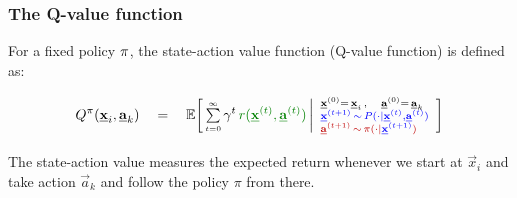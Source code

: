 \begin{frame}\frametitle{The Q-value function}

For a fixed policy ${\color{policy}}\pi$, the state-action value function (Q-value function) is defined as:

\begin{equation}
		Q^\pi(\vec x_i, \vec a_k) \quad=\quad 
		\E\bigg\lbrack \,
			\smallsum{t=0}\infty \, \gamma^t \,  
				{\color{reward}r(\vec x^{(t)}, \vec a^{(t)})}
			\, \bigg| \begin{array}{l}
				\scriptstyle \vec x^{(0)} =\, \vec x_i \,, \quad 
					\vec a^{(0)} =\, \vec a_k \\[-1mm]
				\scriptstyle {\color{trans} \vec x^{(t+1)} 
					\,\sim\, P(\cdot|\vec x^{(t)}, \vec a^{(t)})}\\[-1mm]
				\scriptstyle {\color{policy} \vec a^{(t+1)} 
				\,\sim\, \pi(\cdot|{\color{trans}\vec x^{(t+1)}})}
			\end{array}	
		\bigg\rbrack
\end{equation}

The state-action value measures the expected return whenever we start at $\vec x_i$ and take action $\vec a_k$ and follow the policy $\pi$ from there.

\end{frame}


